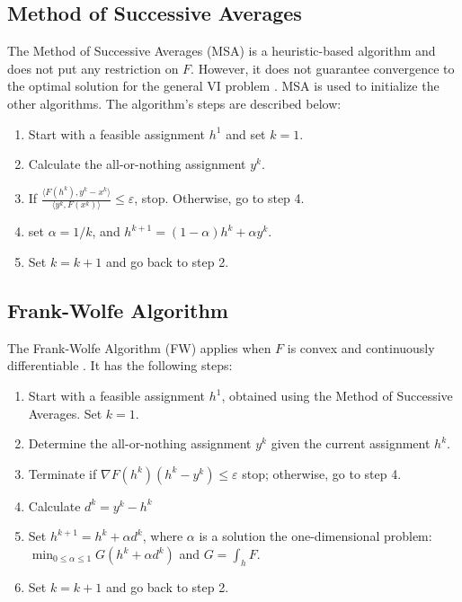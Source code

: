 \documentclass[conference]{IEEEtran}
\renewcommand{\:}{\mathrel{\coloneqq}}
\renewcommand{\=}{\ensuremath{\eqqcolon}}
\renewcommand{\epsilon}{\varepsilon}
\newcommand{\0}{\ensuremath{\boldsymbol{0}}}
\begin{document}
\subsection{Method of Successive Averages}
The Method of Successive Averages (MSA) is a heuristic-based algorithm and does not put any restriction on $F$. However, it does not guarantee convergence to the optimal solution for the general VI problem \cite{nie2010solving}. MSA is used to initialize the other algorithms. The algorithm's steps are described below:
\begin{enumerate}
    \item Start with a feasible assignment $h^1$ and set $k=1$.
    \item Calculate the all-or-nothing assignment $y^k$.
    \item If ${\frac {\langle F(h^k),y^k-x^k \rangle} {\langle y^k, F(x^k)\rangle}} \leq
    \epsilon$, stop. Otherwise, go to step 4.
    \item set $\alpha = 1/k$, and $h^{k+1} = (1-\alpha)h^k + \alpha y^k$. 
    \item Set $k = k+1$ and go back to step 2.
\end{enumerate}

\subsection{Frank-Wolfe Algorithm}
The Frank-Wolfe Algorithm (FW) applies when $F$ is convex and continuously differentiable \cite{fukushima1984modified,gartner1977analysis}. It has the following steps:
\begin{enumerate}
\item Start with a feasible assignment $h^1$, obtained using the Method of Successive Averages. Set $k=1$.
\item Determine the all-or-nothing assignment $y^k$ given the current assignment $h^k$.
\item Terminate if $\nabla F(h^k)(h^k-y^k) \leq \epsilon$ stop; otherwise, go to step 4.
\item Calculate $d^k = y^k - h^k$
\item Set $h^{k+1} = h^k +\alpha d^k$, where $\alpha$ is a solution the one-dimensional problem: $\min_{0 \leq \alpha \leq 1}G(h^k + \alpha d^k)$ and $G = \int_h F$.
\item Set $k = k+1$ and go back to step 2.
\end{enumerate}
\end{document}
